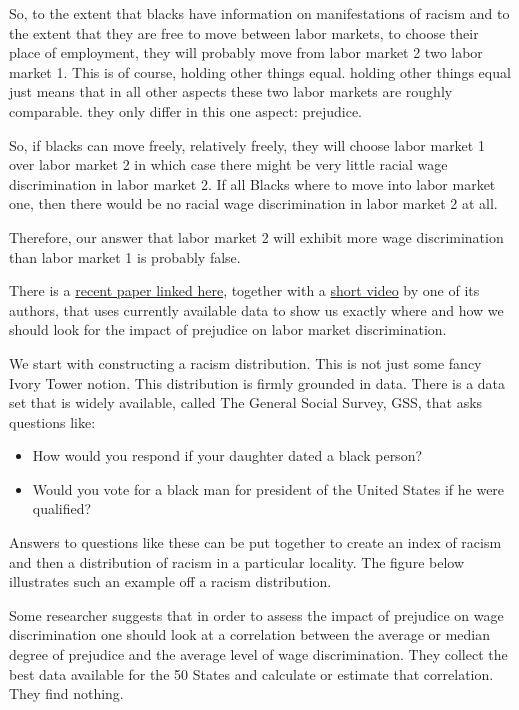 \documentclass[
]{book}
\providecommand{\tightlist}{%
  \setlength{\itemsep}{0pt}\setlength{\parskip}{0pt}}
\begin{document}
So, to the extent that blacks have information on manifestations of racism and to the extent that they are free to move between labor markets, to choose their place of employment, they will probably move from labor market 2 two labor market 1. This is of course, holding other things equal. holding other things equal just means that in all other aspects these two labor markets are roughly comparable. they only differ in this one aspect: prejudice.

So, if blacks can move freely, relatively freely, they will choose labor market 1 over labor market 2 in which case there might be very little racial wage discrimination in labor market 2. If all Blacks where to move into labor market one, then there would be no racial wage discrimination in labor market 2 at all.

Therefore, our answer that labor market 2 will exhibit more wage discrimination than labor market 1 is probably false.

There is a \href{https://papers.ssrn.com/sol3/papers.cfm?abstract_id=1073644}{recent paper linked here}, together with a \href{https://www.youtube.com/watch?v=N38XrQ6x7ck}{short video} by one of its authors, that uses currently available data to show us exactly where and how we should look for the impact of prejudice on labor market discrimination.

We start with constructing a racism distribution. This is not just some fancy Ivory Tower notion. This distribution is firmly grounded in data. There is a data set that is widely available, called The General Social Survey, GSS, that asks questions like:

\begin{itemize}
\tightlist
\item
  How would you respond if your daughter dated a black person?
\item
  Would you vote for a black man for president of the United States if he were qualified?
\end{itemize}

Answers to questions like these can be put together to create an index of racism and then a distribution of racism in a particular locality. The figure below illustrates such an example off a racism distribution.

Some researcher suggests that in order to assess the impact of prejudice on wage discrimination one should look at a correlation between the average or median degree of prejudice and the average level of wage discrimination. They collect the best data available for the 50 States and calculate or estimate that correlation. They find nothing.
\end{document}
